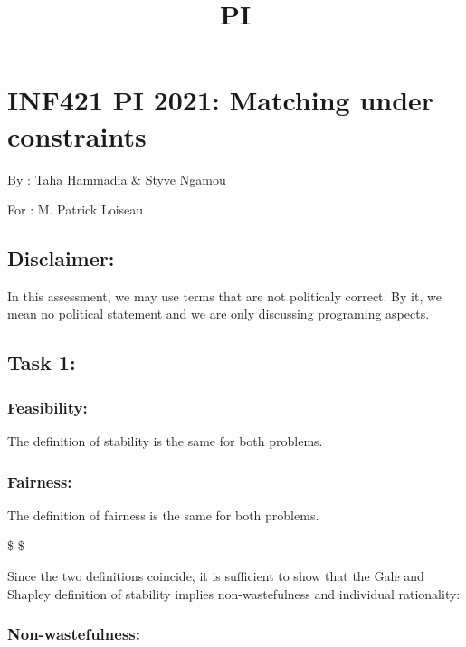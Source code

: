 \documentclass[11pt]{article}
\title{PI}
\begin{document}
    
    \maketitle
    
    

    
    \hypertarget{inf421-pi-2021-matching-under-constraints}{%
\section{INF421 PI 2021: Matching under
constraints}\label{inf421-pi-2021-matching-under-constraints}}

    By : Taha Hammadia \& Styve Ngamou

    For : M. Patrick Loiseau

    \hypertarget{disclaimer}{%
\subsection{Disclaimer:}\label{disclaimer}}

In this assessment, we may use terms that are not politicaly correct. By
it, we mean no political statement and we are only discussing programing
aspects.

    \hypertarget{task-1}{%
\subsection{Task 1:}\label{task-1}}

\hypertarget{feasibility}{%
\subsubsection{Feasibility:}\label{feasibility}}

The definition of stability is the same for both problems.

\hypertarget{fairness}{%
\subsubsection{Fairness:}\label{fairness}}

The definition of fairness is the same for both problems.

\$ \$

Since the two definitions coincide, it is sufficient to show that the
Gale and Shapley definition of stability implies non-wastefulness and
individual rationality:

\hypertarget{non-wastefulness}{%
\subsubsection{Non-wastefulness:}\label{non-wastefulness}}
\end{document}
